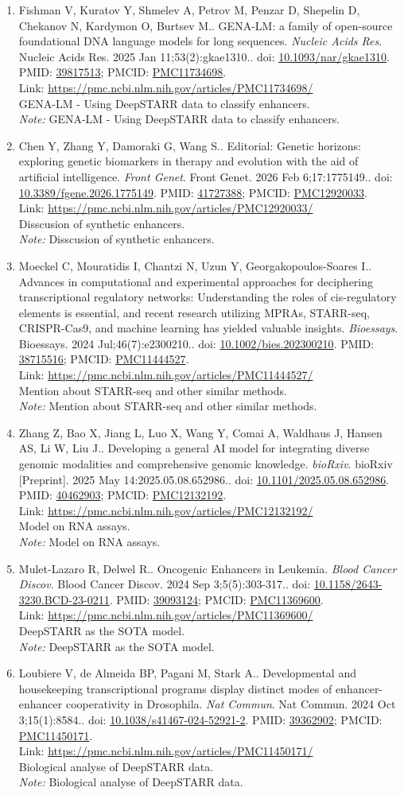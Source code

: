 \documentclass[12pt]{article}
\newcommand{\Pub}[9]{%
  \item #1. #2. \textit{#3}. #4. doi: \href{https://doi.org/#5}{#5}. PMID: \href{https://pubmed.ncbi.nlm.nih.gov/#6/}{#6}; PMCID: \href{https://www.ncbi.nlm.nih.gov/pmc/articles/#7/}{#7}. \\
  \noindent Link: \url{#8}\\
  \ifx#9\relax\else\\\textit{Note:} #9\fi
}
\begin{document}
\begin{enumerate}[leftmargin=*,label=\textbf{\arabic*.}]
\Pub{Fishman V, Kuratov Y, Shmelev A, Petrov M, Penzar D, Shepelin D, Chekanov N, Kardymon O, Burtsev M.}{GENA-LM: a family of open-source foundational DNA language models for long sequences}{Nucleic Acids Res}{Nucleic Acids Res. 2025 Jan 11;53(2):gkae1310.}{10.1093/nar/gkae1310}{39817513}{PMC11734698}{https://pmc.ncbi.nlm.nih.gov/articles/PMC11734698/}{GENA-LM - Using DeepSTARR data to classify enhancers.}

\Pub{Chen Y, Zhang Y, Damoraki G, Wang S.}{Editorial: Genetic horizons: exploring genetic biomarkers in therapy and evolution with the aid of artificial intelligence}{Front Genet}{Front Genet. 2026 Feb 6;17:1775149.}{10.3389/fgene.2026.1775149}{41727388}{PMC12920033}{https://pmc.ncbi.nlm.nih.gov/articles/PMC12920033/}{Disscusion of synthetic enhancers.}

\Pub{Moeckel C, Mouratidis I, Chantzi N, Uzun Y, Georgakopoulos-Soares I.}{Advances in computational and experimental approaches for deciphering transcriptional regulatory networks: Understanding the roles of cis-regulatory elements is essential, and recent research utilizing MPRAs, STARR-seq, CRISPR-Cas9, and machine learning has yielded valuable insights}{Bioessays}{Bioessays. 2024 Jul;46(7):e2300210.}{10.1002/bies.202300210}{38715516}{PMC11444527}{https://pmc.ncbi.nlm.nih.gov/articles/PMC11444527/}{Mention about STARR-seq and other similar methods.}

\Pub{Zhang Z, Bao X, Jiang L, Luo X, Wang Y, Comai A, Waldhaus J, Hansen AS, Li W, Liu J.}{Developing a general AI model for integrating diverse genomic modalities and comprehensive genomic knowledge}{bioRxiv}{bioRxiv [Preprint]. 2025 May 14:2025.05.08.652986.}{10.1101/2025.05.08.652986}{40462903}{PMC12132192}{https://pmc.ncbi.nlm.nih.gov/articles/PMC12132192/}{Model on RNA assays.}

\Pub{Mulet-Lazaro R, Delwel R.}{Oncogenic Enhancers in Leukemia}{Blood Cancer Discov}{Blood Cancer Discov. 2024 Sep 3;5(5):303-317.}{10.1158/2643-3230.BCD-23-0211}{39093124}{PMC11369600}{https://pmc.ncbi.nlm.nih.gov/articles/PMC11369600/}{DeepSTARR as the SOTA model.}

\newpage

\Pub{Loubiere V, de Almeida BP, Pagani M, Stark A.}{Developmental and housekeeping transcriptional programs display distinct modes of enhancer-enhancer cooperativity in Drosophila}{Nat Commun}{Nat Commun. 2024 Oct 3;15(1):8584.}{10.1038/s41467-024-52921-2}{39362902}{PMC11450171}{https://pmc.ncbi.nlm.nih.gov/articles/PMC11450171/}{Biological analyse of DeepSTARR data.}


\end{enumerate}
\end{document}
